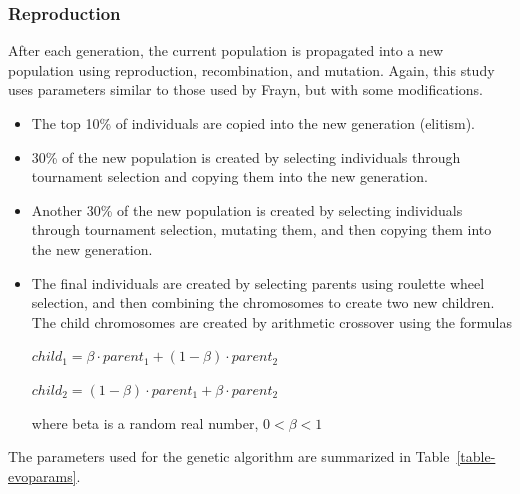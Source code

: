 \subsubsection{Reproduction}

After each generation, the current population is propagated into a new
population using reproduction, recombination, and mutation. Again, this study
uses parameters similar to those used by Frayn, but with some modifications.

\begin{itemize}
  \item {The top 10\% of individuals are copied into the new generation
  (elitism).}
  \item {30\% of the new population is created by selecting individuals through
  tournament selection and copying them into the new generation.}
  \item {Another 30\% of the new population is created by selecting individuals
  through tournament selection, mutating them, and then copying them into the new
  generation.}
  \item {The final individuals are created by selecting parents using
  roulette wheel selection, and then combining the chromosomes to create two
  new children. The child chromosomes are created by arithmetic crossover using
  the formulas 
  
\(child_{1} = \beta \cdot parent_{1} + (1 - \beta ) \cdot parent_{2}\)

\(child_{2} = (1 - \beta ) \cdot parent_{1} + \beta \cdot parent_{2}\)

where beta is a random real number, \(0 < \beta < 1\)}
\end{itemize}

The parameters used for the genetic algorithm are summarized in
Table~\ref{table-evoparams}.

